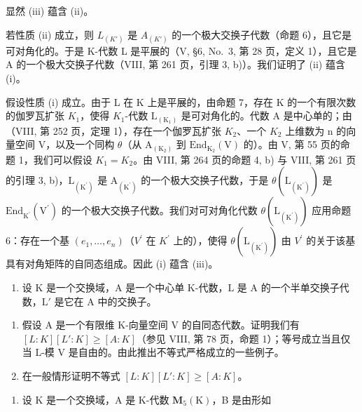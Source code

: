 显然 (iii) 蕴含 (ii)。

若性质 (ii) 成立，则 \(L_{(K')}\) 是 \(A_{(K')}\) 的一个极大交换子代数（命题 6），且它是可对角化的。于是 K-代数 L 是平展的（V, §6, No.~3, 第 28 页，定义 1），且它是 A 的一个极大交换子代数（VIII, 第 261 页，引理 3, b)）。我们证明了 (ii) 蕴含 (i)。

假设性质 (i) 成立。由于 L 在 K 上是平展的，由命题 7，存在 K 的一个有限次数的伽罗瓦扩张 \(K_{1}\)，使得 \(K_{1}\)-代数 \(\mathrm{L}_{(\mathrm{K}_{1})}\) 是可对角化的。代数 A 是中心单的；由（VIII, 第 252 页，定理 1），存在一个伽罗瓦扩张 \(K_{2}\)、一个 \(K_{2}\) 上维数为 n 的向量空间 V，以及一个同构 \(\theta\)（从 \(\mathrm{A}_{(\mathrm{K}_{2})}\) 到 \(\mathrm{End}_{\mathrm{K}_{2}}(\mathrm{V})\) 的）。由 V, 第 55 页的命题 1，我们可以假设 \(K_{1}=K_{2}\)。由 VIII, 第 264 页的命题 4, b) 与 VIII, 第 261 页的引理 3, b)，\(\mathrm{L}_{(\mathrm{K}^{\prime})}\) 是 \(\mathrm{A}_{(\mathrm{K}^{\prime})}\) 的一个极大交换子代数，于是 \(\theta(\mathrm{L}_{(\mathrm{K}^{\prime})})\) 是 \(\mathrm{End}_{\mathrm{K}^{\prime}}(\mathrm{V}^{\prime})\) 的一个极大交换子代数。我们对可对角化代数 \(\theta(\mathrm{L}_{(\mathrm{K}^{\prime})})\) 应用命题 6：存在一个基 \((e_{1},\ldots,e_{n})\)（\(V^{\prime}\) 在 \(K^{\prime}\) 上的），使得 \(\theta(\mathrm{L}_{(\mathrm{K}^{\prime})})\) 由 \(V^{\prime}\) 的关于该基具有对角矩阵的自同态组成。因此 (i) 蕴含 (iii)。


\begin{enumerate}
\def\labelenumi{\arabic{enumi})}
\tightlist
\item
  设 \(\mathrm{K}\) 是一个交换域，\(\mathrm{A}\) 是一个中心单 K-代数，\(\mathrm{L}\) 是 \(\mathrm{A}\) 的一个半单交换子代数，\(\mathrm{L}'\) 是它在 \(\mathrm{A}\) 中的交换子。
\end{enumerate}

\begin{enumerate}
\def\labelenumi{\alph{enumi})}
\item
  假设 A 是一个有限维 K-向量空间 V 的自同态代数。证明我们有 \([L:K][L':K] \geqslant [A:K]\)（参见 VIII, 第 78 页，命题 1）；等号成立当且仅当 L-模 V 是自由的。由此推出不等式严格成立的一些例子。
\item
  在一般情形证明不等式 \([L:K][L':K] \geqslant [A:K]\)。
\end{enumerate}

\begin{enumerate}
\def\labelenumi{\arabic{enumi})}
\setcounter{enumi}{1}
\tightlist
\item
  设 K 是一个交换域，A 是 K-代数 \(\mathbf{M}_{5}(\mathrm{K})\)，B 是由形如
\end{enumerate}

